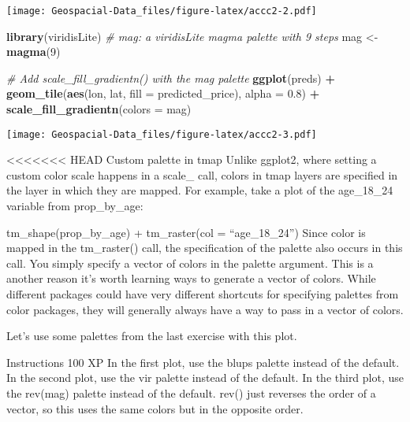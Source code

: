 \documentclass[]{article}
\newenvironment{Shaded}{\begin{snugshade}}{\end{snugshade}}
\newcommand{\CommentTok}[1]{\textcolor[rgb]{0.56,0.35,0.01}{\textit{#1}}}
\newcommand{\DataTypeTok}[1]{\textcolor[rgb]{0.13,0.29,0.53}{#1}}
\newcommand{\DecValTok}[1]{\textcolor[rgb]{0.00,0.00,0.81}{#1}}
\newcommand{\FloatTok}[1]{\textcolor[rgb]{0.00,0.00,0.81}{#1}}
\newcommand{\KeywordTok}[1]{\textcolor[rgb]{0.13,0.29,0.53}{\textbf{#1}}}
\newcommand{\NormalTok}[1]{#1}
\newcommand{\OperatorTok}[1]{\textcolor[rgb]{0.81,0.36,0.00}{\textbf{#1}}}
\newcommand{\StringTok}[1]{\textcolor[rgb]{0.31,0.60,0.02}{#1}}
\begin{document}
\texttt{[image: Geospacial-Data\_files/figure-latex/accc2-2.pdf]}

\begin{Shaded}
\begin{Highlighting}[]
\KeywordTok{library}\NormalTok{(viridisLite)}
\CommentTok{# mag: a viridisLite magma palette with 9 steps}
\NormalTok{mag <-}\StringTok{ }\KeywordTok{magma}\NormalTok{(}\DecValTok{9}\NormalTok{)}

\CommentTok{# Add scale_fill_gradientn() with the mag palette}
\KeywordTok{ggplot}\NormalTok{(preds) }\OperatorTok{+}
\StringTok{  }\KeywordTok{geom_tile}\NormalTok{(}\KeywordTok{aes}\NormalTok{(lon, lat, }\DataTypeTok{fill =}\NormalTok{ predicted_price), }\DataTypeTok{alpha =} \FloatTok{0.8}\NormalTok{) }\OperatorTok{+}
\StringTok{  }\KeywordTok{scale_fill_gradientn}\NormalTok{(}\DataTypeTok{colors =}\NormalTok{ mag) }
\end{Highlighting}
\end{Shaded}

\texttt{[image: Geospacial-Data\_files/figure-latex/accc2-3.pdf]}

\textless\textless\textless\textless\textless\textless\textless{} HEAD
Custom palette in tmap Unlike ggplot2, where setting a custom color
scale happens in a scale\_ call, colors in tmap layers are specified in
the layer in which they are mapped. For example, take a plot of the
age\_18\_24 variable from prop\_by\_age:

tm\_shape(prop\_by\_age) + tm\_raster(col = ``age\_18\_24'') Since color
is mapped in the tm\_raster() call, the specification of the palette
also occurs in this call. You simply specify a vector of colors in the
palette argument. This is a another reason it's worth learning ways to
generate a vector of colors. While different packages could have very
different shortcuts for specifying palettes from color packages, they
will generally always have a way to pass in a vector of colors.

Let's use some palettes from the last exercise with this plot.

Instructions 100 XP In the first plot, use the blups palette instead of
the default. In the second plot, use the vir palette instead of the
default. In the third plot, use the rev(mag) palette instead of the
default. rev() just reverses the order of a vector, so this uses the
same colors but in the opposite order.
\end{document}
